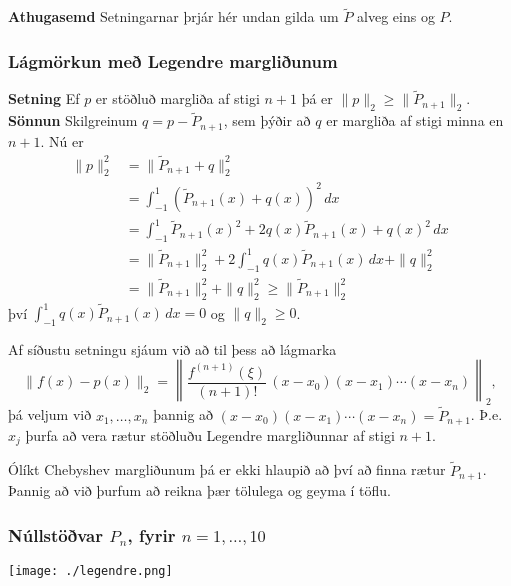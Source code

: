 \documentclass[icelandic,a4paper,12pt]{article}
\begin{document}
 \textbf{Athugasemd}
  Setningarnar þrjár hér undan gilda um $\tilde P$ alveg eins og $P$.
 
 
 \subsubsection{Lágmörkun með Legendre margliðunum}
 \textbf{Setning}
 Ef $p$ er stöðluð margliða af stigi $n+1$ þá er $\|p\|_2\geq \|\tilde P_{n+1}\|_2$.
 \pause
 \textbf{Sönnun}
  Skilgreinum $q = p-\tilde P_{n+1}$, sem þýðir að $q$ er margliða af stigi minna en $n+1$. \pause
  Nú er 
  \begin{align*}
   \|p\|_2^2 &= \|\tilde P_{n+1} + q\|_2^2 \\
   &= \int_{-1}^1 (\tilde P_{n+1}(x) + q(x))^2\, dx \\
   &= \int_{-1}^1 \tilde P_{n+1}(x)^2 + 2q(x)\tilde P_{n+1}(x) + q(x)^2\, dx\\
   &= \|\tilde P_{n+1}\|_2^2 + 2\int_{-1}^1 q(x)\tilde P_{n+1}(x)\, dx + \|q\|_2^2\\
   &= \|\tilde P_{n+1}\|_2^2 +  \|q\|_2^2 \geq \|\tilde P_{n+1}\|_2^2
  \end{align*}
  því $\int_{-1}^1 q(x)\tilde P_{n+1}(x)\, dx=0$ og $\|q\|_2 \geq 0$.
 


  Af síðustu setningu sjáum við að til þess að lágmarka 
  $$
      \|f(x)-p(x)\|_2 = \left\|\frac{f^{(n+1)}(\xi)}{(n+1)!}\, (x-x_0)(x-x_1)\cdots (x-x_n) \right\|_2,
  $$
  þá veljum við $x_1,\ldots,x_n$ þannig að 
  $(x-x_0)(x-x_1)\cdots (x-x_n) = \tilde P_{n+1}$. Þ.e.~$x_j$ þurfa að vera rætur 
  stöðluðu Legendre margliðunnar af stigi $n+1$.
  \pause
  
  Ólíkt Chebyshev margliðunum þá er ekki hlaupið að því að finna rætur $\tilde P_{n+1}$.
  Þannig að við þurfum að reikna þær tölulega og geyma í töflu.
  
  
  \subsubsection{Núllstöðvar $P_n$, fyrir $n=1,\ldots,10$}
  \begin{center}
 \texttt{[image: ./legendre.png]}
\end{center}
\end{document}
